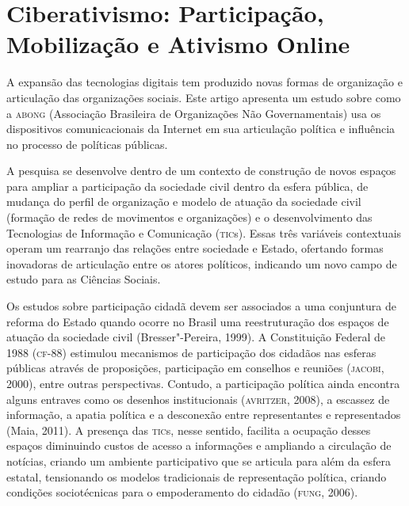 \part{Ciberativismo: Participação, Mobilização e Ativismo Online}




\noindent{}A expansão das tecnologias digitais tem produzido novas formas de
organização e articulação das organizações sociais. Este artigo
apresenta um estudo sobre como a \textsc{abong} (Associação Brasileira de
Organizações Não Governamentais) usa os dispositivos comunicacionais da
Internet em sua articulação política e influência no processo de
políticas públicas.

A pesquisa se desenvolve dentro de um contexto de construção de novos
espaços para ampliar a participação da sociedade civil dentro da esfera
pública, de mudança do perfil de organização e modelo de atuação da
sociedade civil (formação de redes de movimentos e organizações) e o
desenvolvimento das Tecnologias de Informação e Comunicação (\textsc{tic}s).
Essas três variáveis contextuais operam um rearranjo das relações entre
sociedade e Estado, ofertando formas inovadoras de articulação entre os
atores políticos, indicando um novo campo de estudo para as Ciências
Sociais.

Os estudos sobre participação cidadã devem ser associados a uma
conjuntura de reforma do Estado quando ocorre no Brasil uma
reestruturação dos espaços de atuação da sociedade civil
(Bresser"-Pereira, 1999). A Constituição Federal de 1988 (\textsc{cf}-88)
estimulou mecanismos de participação dos cidadãos nas esferas públicas
através de proposições, participação em conselhos e reuniões (\textsc{jacobi},
2000), entre outras perspectivas. Contudo, a participação política ainda
encontra alguns entraves como os desenhos institucionais (\textsc{avritzer},
2008), a escassez de informação, a apatia política e a desconexão entre
representantes e representados (Maia, 2011). A presença das \textsc{tic}s, nesse
sentido, facilita a ocupação desses espaços diminuindo custos de acesso
a informações e ampliando a circulação de notícias, criando um ambiente
participativo que se articula para além da esfera estatal, tensionando
os modelos tradicionais de representação política, criando condições
sociotécnicas para o empoderamento do cidadão (\textsc{fung}, 2006).

